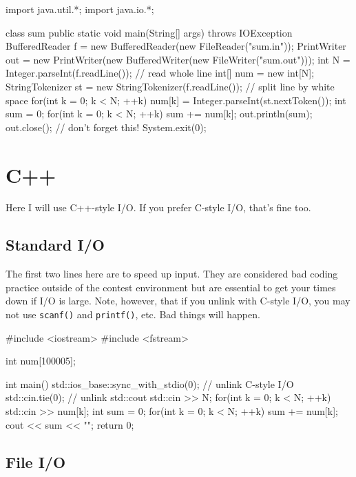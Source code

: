 \documentclass{article}
\begin{document}
\begin{mylstlisting}
import java.util.*;
import java.io.*;

class sum {
    public static void main(String[] args) throws IOException {
        BufferedReader f = new BufferedReader(new FileReader("sum.in"));
		PrintWriter out = new PrintWriter(new BufferedWriter(new FileWriter("sum.out")));
	    int N = Integer.parseInt(f.readLine()); // read whole line
	    int[] num = new int[N];
	    StringTokenizer st = new StringTokenizer(f.readLine()); // split line by white space
    	for(int k = 0; k < N; ++k) {
    		num[k] = Integer.parseInt(st.nextToken());
    	}
    	int sum = 0;
    	for(int k = 0; k < N; ++k) {
    		sum += num[k];
    	}
    	out.println(sum);
    	out.close(); // don't forget this!
    	System.exit(0);
    }
}
\end{mylstlisting}

\section{C++}

\lstset{language=C++}

Here I will use C++-style I/O. If you prefer C-style I/O, that's fine too.

\subsection{Standard I/O}

The first two lines here are to speed up input. They are considered bad coding practice outside of the contest environment but are essential to get your times down if I/O is large. Note, however, that if you unlink with C-style I/O, you may not use \texttt{scanf()} and \texttt{printf()}, etc. Bad things will happen.

\begin{mylstlisting}
#include <iostream>
#include <fstream>

int num[100005];

int main() {
    std::ios_base::sync_with_stdio(0); // unlink C-style I/O
    std::cin.tie(0); // unlink std::cout
	std::cin >> N;
	for(int k = 0; k < N; ++k) {
		std::cin >> num[k];
	}
	int sum = 0;
	for(int k = 0; k < N; ++k) {
		sum += num[k];
	}
	cout << sum << "\n";
	return 0;
}
\end{mylstlisting}

\subsection{File I/O}
\end{document}
